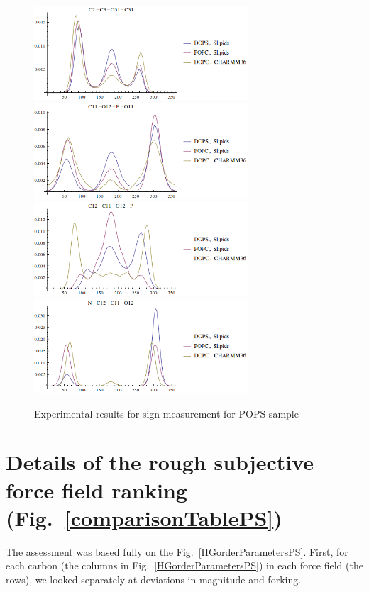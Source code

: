 \documentclass[aps,prl,superscriptaddress,twocolumn]{revtex4}
\begin{document}
\begin{figure}[]
  \includegraphics[width=8.0cm]{../Figs/dihed7.png}
  \includegraphics[width=8.0cm]{../Figs/dihed8.png}
  \includegraphics[width=8.0cm]{../Figs/dihed9.png}
  \includegraphics[width=8.0cm]{../Figs/dihed10.png}
  \caption{\label{dihedrals}
    Experimental results for sign measurement for POPS sample
  }
\end{figure}



\pagebreak
\section{Details of the rough subjective force field ranking (Fig.~\ref{comparisonTablePS})} 

The assessment was based fully on the Fig.~\ref{HGorderParametersPS}.
%
First, for each carbon (the columns in Fig.~\ref{HGorderParametersPS}) in each force field (the rows),
we looked separately at deviations in magnitude and forking.
\end{document}
